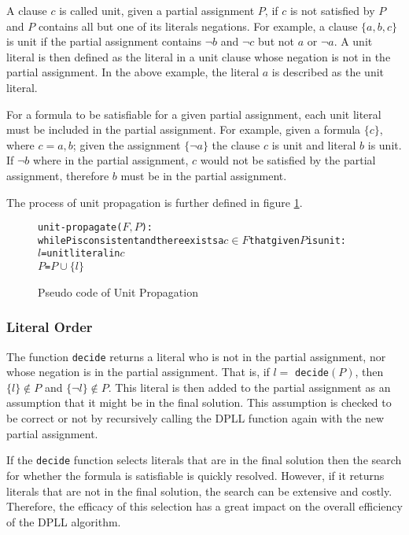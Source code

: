A clause $c$ is called unit, given a partial assignment $P$, if $c$ is not satisfied by $P$ and $P$ contains all but one of its literals negations.
For example, a clause $\{a,b,c\}$ is unit if the partial assignment contains $\neg b$ and $\neg c$ but not $a$ or $\neg a$.
A unit literal is then defined as the literal in a unit clause whose negation is not in the partial assignment.
In the above example, the literal $a$ is described as the unit literal.

For a formula to be satisfiable for a given partial assignment, each unit literal must be included in the partial assignment.
For example, given a formula $\{c\}$, where $c = {a,b}$;
given the assignment $\{\neg a\}$ the clause $c$ is unit and literal $b$ is unit.
If $\neg b$ where in the partial assignment, $c$ would not be satisfied by the partial assignment,
therefore $b$ must be in the partial assignment.

The process of unit propagation is further defined in figure \ref{impl.propagation}.
\begin{figure}[htp]
\begin{center}
\begin{alltt}
unit-propagate(\(F, P\)):
    while P is consistent and there exists a \(c \in F\) that given \(P\) is unit:
        \(l\) = unit literal in \(c\)
        \(P\) = \(P \cup \{l\}\)
\end{alltt}
  \caption{Pseudo code of Unit Propagation}
  \label{impl.propagation}
\end{center}
\end{figure}

\subsubsection{Literal Order}
The function \verb+decide+ returns a literal who is not in the partial assignment, nor whose negation is in the partial assignment.
That is, if $l =$ \verb+decide+$(P)$, then $\{l\} \not \in P$ and $\{\neg l\} \not \in P$.
This literal is then added to the partial assignment as an assumption that it might be in the final solution.
This assumption is checked to be correct or not by recursively calling the DPLL function again with the new partial assignment.

If the \verb+decide+ function selects literals that are in the final solution then the search for whether the formula is satisfiable is quickly resolved.
However, if it returns literals that are not in the final solution, the search can be extensive and costly.
Therefore, the efficacy of this selection has a great impact on the overall efficiency of the DPLL algorithm.

